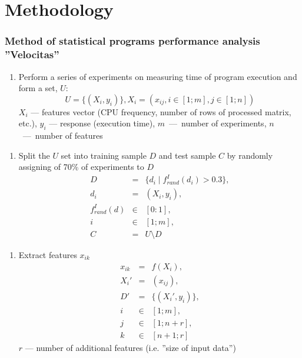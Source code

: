 \documentclass{beamer}
\newcounter{saveenumi}
\newcommand{\seti}{\setcounter{saveenumi}{\value{enumi}}}
\newcommand{\conti}{\setcounter{enumi}{\value{saveenumi}}}
\begin{document}
\section{Methodology}

\begin{frame}
\frametitle{Method of statistical programs performance analysis ''Velocitas''}

	\begin{enumerate}
		\item Perform a series of experiments on measuring time of program execution and form a set, $U$:
			\begin{equation*}
				U = \{ ( X_i, y_i ) \}, X_i = (x_{ij}, i \in [1;m], j \in [1;n])
			\end{equation*}
		$X_i$ --- features vector (CPU frequency, number of rows of processed matrix, etc.), $y_i$ --- response (execution time), $m$~---~number of experiments, $n$~---~number of features
		\seti
	\end{enumerate}

\end{frame}

\begin{frame}
	\begin{enumerate}
		\conti
		\item Split the $U$ set into training sample $D$ and test sample $C$ by randomly assigning of 70\% of experiments to $D$
			\begin{eqnarray}
				D &=& \{d_i \mid f_{rand}^I(d_i) > 0.3\}, \\
				d_i &=& (X_i, y_i), \\
				f_{rand}^I(d) &\in & [0:1], \\
				i &\in & [1;m], \\
				C &=& U \setminus D
			\end{eqnarray}
		\seti
	\end{enumerate}
\end{frame}


\begin{frame}
	\begin{enumerate}
		\conti
		\item Extract features $x_{ik}$
			\begin{eqnarray}
				x_{ik} &=& f(X_i), \\
				X_i' &=& (x_{ij}) , \\
				D' &=& \{ (X_i' , y_i) \}, \\
				i &\in & [1;m], \\
				j &\in & [1;n+r], \\
				k &\in & [n+1;r]
			\end{eqnarray}
			$r$ --- number of additional features (i.e. ''size of input data'')
		\seti
	\end{enumerate}
\end{frame}
\end{document}
